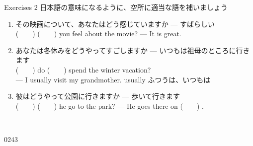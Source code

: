 \documentclass[aspectratio=169,xcolor={dvipsnames,table}]{beamer}
\begin{document}
\begin{frame}[plain]{Exercises 2}
 日本語の意味になるように、空所に適当な語を補いましょう
\begin{enumerate}
 \item {\small その映画について、あなたはどう感じていますか --- すばらしい}\\
       (~~~~)  (~~~~)  you feel about the movie? --- It is great.
 \item {\small あなたは冬休みをどうやってすごしますか --- いつもは祖母のところに行きます}\\
       (~~~~)  do (~~~~)  spend the winter vacation?\\
 --- I usually visit my grandmother.%
\hfill{\scriptsize usually  ふつうは、いつもは}
 \item {\small 彼はどうやって公園に行きますか --- 歩いて行きます}\\
       (~~~~)  (~~~~)  he go to the park? --- He goes there on  (~~~~) .
\end{enumerate}

\mbox{}\hfill{}\\
\hfill {}

\hfill{\tiny 0243}\,{\scriptsize {}}

\end{frame}
\end{document}
